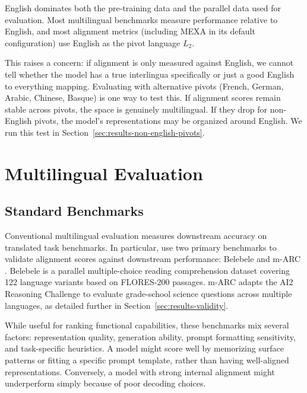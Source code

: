English dominates both the pre-training data and the parallel data used for evaluation. Most multilingual benchmarks measure performance relative to English, and most alignment metrics (including MEXA in its default configuration) use English as the pivot language $L_2$.

This raises a concern: if alignment is only measured against English, we cannot tell whether the model has a true interlingua specifically or just a good English to everything mapping. Evaluating with alternative pivots (French, German, Arabic, Chinese, Basque) is one way to test this. If alignment scores remain stable across pivots, the space is genuinely multilingual. If they drop for non-English pivots, the model's representations may be organized around English. We run this test in Section~\ref{sec:results-non-english-pivots}.

\section{Multilingual Evaluation}
\label{sec:multilingual-evaluation}

\subsection{Standard Benchmarks}
\label{subsec:standard-benchmarks}

Conventional multilingual evaluation measures downstream accuracy on translated task benchmarks. In particular, \citet{kargaran2025mexa} use two primary benchmarks to validate alignment scores against downstream performance: Belebele \citep{bandarkar2024belebele} and m-ARC \citep{lai2023okapi}. Belebele is a parallel multiple-choice reading comprehension dataset covering 122 language variants based on FLORES-200 passages. m-ARC adapts the AI2 Reasoning Challenge to evaluate grade-school science questions across multiple languages, as detailed further in Section~\ref{sec:results-validity}.

While useful for ranking functional capabilities, these benchmarks mix several factors: representation quality, generation ability, prompt formatting sensitivity, and task-specific heuristics. A model might score well by memorizing surface patterns or fitting a specific prompt template, rather than having well-aligned representations. Conversely, a model with strong internal alignment might underperform simply because of poor decoding choices.


